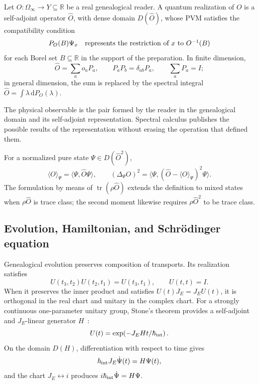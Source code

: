 Let \(O:\Omega_\infty\to Y\subseteq\mathbb R\) be a real genealogical reader. A quantum realization of
\(O\) is a self-adjoint operator \(\widehat O\), with dense domain
\(D(\widehat O)\), whose PVM satisfies the compatibility condition
\[
 P_O(B)\Psi_x
 \quad\hbox{represents the restriction of \(x\) to \(O^{-1}(B)\)}
\]
for each Borel set \(B\subseteq\mathbb R\) in the support of the preparation.
In finite dimension,
\[
 \widehat O=\sum_a o_a P_a,
 \qquad
 P_a P_b=\delta_{ab}P_a,
 \qquad
 \sum_a P_a=I;
\]
in general dimension, the sum is replaced by the spectral integral
\(\widehat O=\int\lambda\,\mathrm dP_O(\lambda)\).

\begin{principle}
The physical observable is the pair formed by the reader in the
genealogical domain and its self-adjoint representation. Spectral calculus publishes the
possible results of the representation without erasing the operation that
defined them.
\end{principle}

For a normalized pure state \(\Psi\in D(\widehat O^2)\),
\[
 \langle O\rangle_\Psi
 =\langle\Psi,\widehat O\Psi\rangle,
 \qquad
 (\Delta_\Psi O)^2
 =\langle\Psi,(\widehat O-\langle O\rangle_\Psi)^2\Psi\rangle.
\]
The formulation by means of \(\operatorname{tr}(\rho\widehat O)\) extends the definition to mixed
states when \(\rho\widehat O\) is trace class; the second moment likewise requires
\(\rho\widehat O^2\) to be trace class.

\subsection{Evolution, Hamiltonian, and Schrödinger equation}

Genealogical evolution preserves composition of transports. Its
realization satisfies
\[
 U(t_3,t_2)U(t_2,t_1)=U(t_3,t_1),
 \qquad U(t,t)=I.
\]
When it preserves the inner product and satisfies
\(U(t)J_E=J_EU(t)\), it is orthogonal in the real chart and unitary in the
complex chart. For a strongly continuous one-parameter unitary group,
Stone's theorem provides a self-adjoint and \(J_E\)-linear
generator \(H\)~\cite{Stone1932}:
\[
 U(t)=\exp\!\left(-J_E H t/\hbar_{\rm int}\right).
\]
On the domain \(D(H)\), differentiation with respect to time gives
\begin{equation}
 \hbar_{\rm int}J_E\dot\Psi(t)=H\Psi(t),
 \label{eq:schrodinger-genealogico-rev2}
\end{equation}
and the chart \(J_E\leftrightarrow i\) produces
\(i\hbar_{\rm int}\dot\Psi=H\Psi\).

